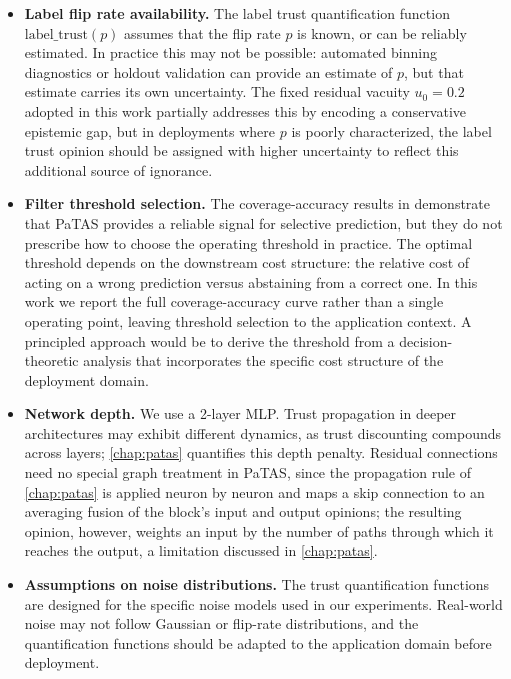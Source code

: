 \begin{itemize}
    \item \textbf{Label flip rate availability.} The label trust quantification function $\text{label\_trust}(p)$ assumes that the flip rate $p$ is known, or can be reliably estimated. In practice this may not be possible: automated binning diagnostics or holdout validation can provide an estimate of $p$, but that estimate carries its own uncertainty. The fixed residual vacuity $u_0 = 0.2$ adopted in this work partially addresses this by encoding a conservative epistemic gap, but in deployments where $p$ is poorly characterized, the label trust opinion should be assigned with higher uncertainty to reflect this additional source of ignorance.

    \item \textbf{Filter threshold selection.} The coverage-accuracy results in  demonstrate that \ac{PaTAS} provides a reliable signal for selective prediction, but they do not prescribe how to choose the operating threshold in practice. The optimal threshold depends on the downstream cost structure: the relative cost of acting on a wrong prediction versus abstaining from a correct one. In this work we report the full coverage-accuracy curve rather than a single operating point, leaving threshold selection to the application context. A principled approach would be to derive the threshold from a decision-theoretic analysis that incorporates the specific cost structure of the deployment domain.

    \item \textbf{Network depth.} We use a 2-layer \ac{MLP}. Trust propagation in deeper architectures may exhibit different dynamics, as trust discounting compounds across layers; \cref{chap:patas} quantifies this depth penalty. Residual connections need no special graph treatment in \ac{PaTAS}, since the propagation rule of \cref{chap:patas} is applied neuron by neuron and maps a skip connection to an averaging fusion of the block's input and output opinions; the resulting opinion, however, weights an input by the number of paths through which it reaches the output, a limitation discussed in \cref{chap:patas}.

    \item \textbf{Assumptions on noise distributions.} The trust quantification functions are designed for the specific noise models used in our experiments. Real-world noise may not follow Gaussian or flip-rate distributions, and the quantification functions should be adapted to the application domain before deployment.


\end{itemize}
